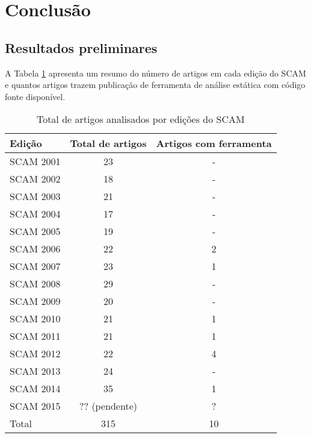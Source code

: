 \documentclass[12pt]{article}
\begin{document}
\section{Conclusão}

\subsection{Resultados preliminares}\label{resultados}

A Tabela \ref{artigos-do-scam} apresenta um resumo do número de artigos em
cada edição do SCAM e quantos artigos trazem publicação de ferramenta de análise
estática com código fonte disponível.

\begin{table}
\caption{Total de artigos analisados por edições do SCAM}
\centering
\begin{tabular}{| l | c | c |}
\hline
Edição    & Total de artigos & Artigos com ferramenta \\
\hline
SCAM 2001 & 23               & -                      \\
SCAM 2002 & 18               & -                      \\
SCAM 2003 & 21               & -                      \\
SCAM 2004 & 17               & -                      \\
SCAM 2005 & 19               & -                      \\
SCAM 2006 & 22               & 2                      \\
SCAM 2007 & 23               & 1                      \\
SCAM 2008 & 29               & -                      \\
SCAM 2009 & 20               & -                      \\
SCAM 2010 & 21               & 1                      \\
SCAM 2011 & 21               & 1                      \\
SCAM 2012 & 22               & 4                      \\
SCAM 2013 & 24               & -                      \\
SCAM 2014 & 35               & 1                      \\
SCAM 2015 & ?? (pendente)    & ?                      \\
\hline
Total     & 315              & 10                     \\
\hline
\end{tabular}
\label{artigos-do-scam}
\end{table}
\end{document}

